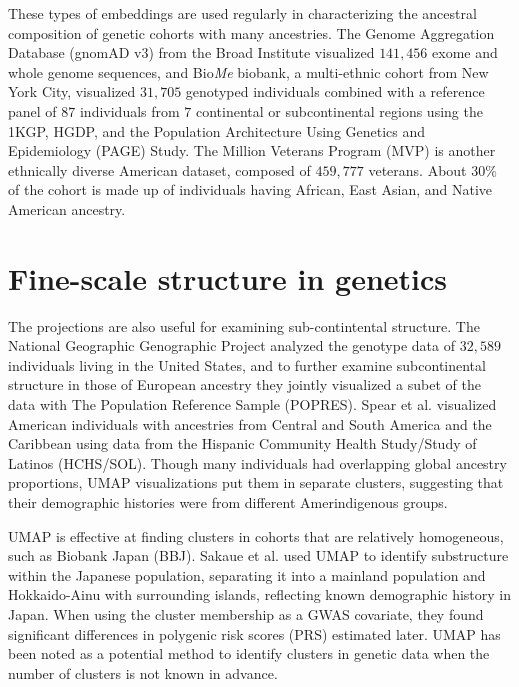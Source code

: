 \documentclass[12pt]{article}
\begin{document}
These types of embeddings are used regularly in characterizing the ancestral composition of genetic cohorts with many ancestries. The Genome Aggregation Database (gnomAD v3) from the Broad Institute visualized $141,456$ exome and whole genome sequences\cite{karczewski_mutational_2020}, and Bio\textit{Me} biobank, a multi-ethnic cohort from New York City, visualized $31,705$ genotyped individuals combined with a reference panel of $87$ individuals from $7$ continental or subcontinental regions using the 1KGP, HGDP, and the Population Architecture Using Genetics and Epidemiology (PAGE) Study\cite{matise2011next}. The Million Veterans Program (MVP) is another ethnically diverse American dataset, composed of $459,777$ veterans. About $30\%$ of the cohort is made up of individuals having African, East Asian, and Native American ancestry\cite{hunter-zinck_genotyping_2020}.

\section*{Fine-scale structure in genetics}
The projections are also useful for examining sub-contintental structure. The National Geographic Genographic Project analyzed the genotype data of $32,589$ individuals living in the United States\cite{dai_population_2020}, and to further examine subcontinental structure in those of European ancestry they jointly visualized a subet of the data with The Population Reference Sample (POPRES)\cite{nelson2008population}. Spear et al. visualized American individuals with ancestries from Central and South America and the Caribbean using data from the Hispanic Community Health Study/Study of Latinos (HCHS/SOL)\cite{sorlie2010design}. Though many individuals had overlapping global ancestry proportions, UMAP visualizations put them in separate clusters, suggesting that their demographic histories were from different Amerindigenous groups\cite{spear2020recent}.

UMAP is effective at finding clusters in cohorts that are relatively homogeneous, such as Biobank Japan (BBJ)\cite{nagai2017overview}. Sakaue et al.\cite{sakaue_dimensionality_2020} used UMAP to identify substructure within the Japanese population, separating it into a mainland population and Hokkaido-Ainu with surrounding islands, reflecting known demographic history in Japan. When using the cluster membership as a GWAS covariate, they found significant differences in polygenic risk scores (PRS) estimated later. UMAP has been noted as a potential method to identify clusters in  genetic data when the number of clusters is not known in advance\cite{tonkin-hill_fast_2019}.
\end{document}
